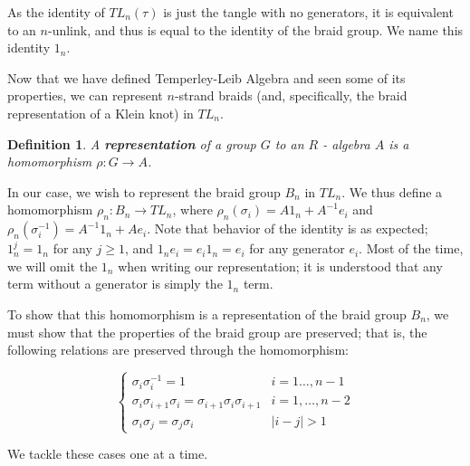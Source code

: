 \documentclass[12pt]{article}
\newtheorem{definition}{Definition}[section]
\begin{document}
As the identity of $TL_n(\tau)$ is just the tangle with no generators, it is equivalent to an $n$-unlink, and thus is equal to the identity of the braid group. We name this identity $1_n$. 

Now that we have defined Temperley-Leib Algebra and seen some of its properties, we can represent $n$-strand braids (and, specifically, the braid representation of a Klein knot) in $TL_n$. 

\begin{definition}
A \textbf{representation} of a group $G$ to an $R$ - algebra $A$ is a homomorphism $\rho: G \rightarrow A$.
\end{definition}

In our case, we wish to represent the braid group $B_n$ in $TL_n$. We thus define a homomorphism $\rho_n: B_n \rightarrow TL_n$, where $\rho_n(\sigma_i) = A 1_n+ A^{-1} e_i$ and $\rho_n(\sigma_i^{-1}) = A^{-1} 1_n + Ae_i$. Note that behavior of the identity is as expected; $1_n^j = 1_n$ for any $j \geq 1$, and $1_n e_i = e_i 1_n = e_i$ for any generator $e_i$. Most of the time, we will omit the $1_n$ when writing our representation; it is understood that any term without a generator is simply the $1_n$ term. 

To show that this homomorphism is a representation of the braid group $B_n$, we must show that the properties of the braid group are preserved; that is, the following relations are preserved through the homomorphism: 

$$\begin{cases}
\sigma_i \sigma_{i}^{-1} = 1 & i = 1  \dots, n - 1 \\
\sigma_i \sigma_{i + 1} \sigma_i = \sigma_{i + 1} \sigma_i \sigma_{i + 1} & i = 1, \dots, n - 2 \\
\sigma_i \sigma_j = \sigma_j \sigma_i & |i - j| > 1
\end{cases}$$

We tackle these cases one at a time. 
\end{document}
